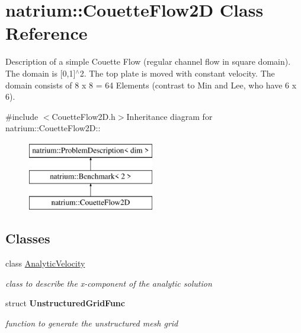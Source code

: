 \hypertarget{classnatrium_1_1CouetteFlow2D}{
\section{natrium::CouetteFlow2D Class Reference}
\label{classnatrium_1_1CouetteFlow2D}
}


Description of a simple Couette Flow (regular channel flow in square domain). The domain is \mbox{[}0,1\mbox{]}$^\wedge$2. The top plate is moved with constant velocity. The domain consists of 8 x 8 = 64 Elements (contrast to Min and Lee, who have 6 x 6).  


{\ttfamily \#include $<$CouetteFlow2D.h$>$}Inheritance diagram for natrium::CouetteFlow2D::\begin{figure}[H]
\begin{center}
\leavevmode
\includegraphics[height=3cm]{classnatrium_1_1CouetteFlow2D}
\end{center}
\end{figure}
\subsection*{Classes}
\begin{DoxyCompactItemize}
\item 
class \hyperlink{classnatrium_1_1CouetteFlow2D_1_1AnalyticVelocity}{AnalyticVelocity}
\begin{DoxyCompactList}\small\item\em class to describe the x-\/component of the analytic solution \item\end{DoxyCompactList}\item 
struct {\bfseries UnstructuredGridFunc}
\begin{DoxyCompactList}\small\item\em function to generate the unstructured mesh grid \item\end{DoxyCompactList}\end{DoxyCompactItemize}
